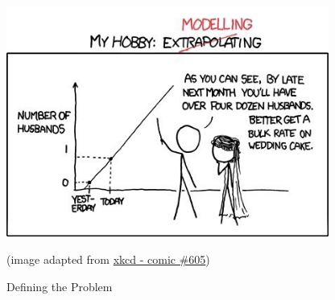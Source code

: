 \begin{topic}
\vfill


\begin{center}
\begin{minipage}{300pt}
	\includegraphics*[width=300pt]{images/chap1-xkcd.jpg}

	\hfill {\footnotesize (image adapted from \href{https://www.xkcd.com/605/}{xkcd - comic \#605})}
\end{minipage}
\end{center}




\end{topic}






%
%




\begin{module}{Defining the Problem}
	\label{moddefine}

	
	
\end{module}


